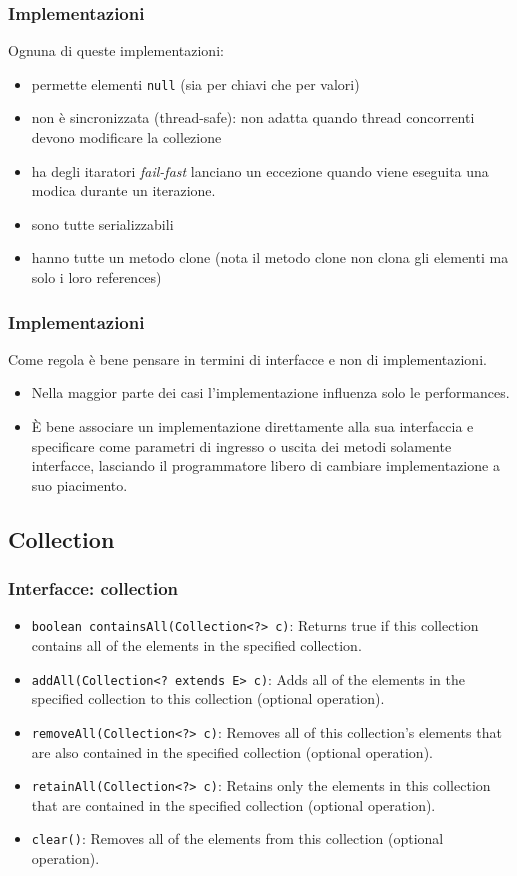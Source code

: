 \documentclass{beamer}
\begin{document}
\begin{frame}[fragile]
\frametitle{Implementazioni}
Ognuna di queste implementazioni:
\begin{itemize}
\item permette elementi \texttt{null} (sia per chiavi che per valori)
\item non \`e sincronizzata (thread-safe): non adatta quando thread concorrenti devono modificare la collezione
\item ha degli itaratori \emph{fail-fast} lanciano un eccezione quando viene eseguita una modica durante un iterazione. 
\item sono tutte serializzabili
\item hanno tutte un metodo clone (nota il metodo clone non clona gli elementi ma solo i loro references)
\end{itemize}
\end{frame}

\begin{frame}[fragile]
\frametitle{Implementazioni}
\begin{framed}
Come regola \`e bene pensare in termini di interfacce e non di implementazioni. 
\begin{itemize}
\item Nella maggior parte dei casi l'implementazione influenza solo le performances. 
\item \`E bene associare un implementazione direttamente alla sua interfaccia e specificare come parametri di ingresso o uscita dei metodi solamente interfacce, lasciando il programmatore libero di cambiare implementazione a suo piacimento. 
\end{itemize}
\end{framed}
\end{frame}
%
%


\subsection{Collection}
\begin{frame}[fragile]
\frametitle{Interfacce: collection}
\begin{itemize}
\item \texttt{boolean	containsAll(Collection<?> c)}: Returns true if this collection contains all of the elements in the specified collection.
\item \texttt{addAll(Collection<? extends E> c)}: Adds all of the elements in the specified collection to this collection (optional operation).
\item \texttt{removeAll(Collection<?> c)}: Removes all of this collection's elements that are also contained in the specified collection (optional operation).
\item \texttt{retainAll(Collection<?> c)}: Retains only the elements in this collection that are contained in the specified collection (optional operation).
\item \texttt{clear()}: Removes all of the elements from this collection (optional operation).
\end{itemize}
\end{frame}
\end{document}
